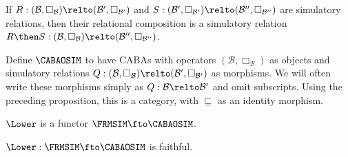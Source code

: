 \documentclass[a4paper,UKenglish,cleveref, autoref]{lipics-v2021}
\begin{document}
\begin{proposition}
  \label{proposition:simulatory-compose}
  If
  \(R : (\mathcal{B}, \Box_\mathcal{B}) \relto (\mathcal{B}',
  \Box_{\mathcal{B}'})\) and
  \(S : (\mathcal{B}', \Box_{\mathcal{B}'}) \relto (\mathcal{B}'',
  \Box_{\mathcal{B}''})\) are simulatory relations, then their relational
  composition is a simulatory relation
  \(R \then S : (\mathcal{B}, \Box_\mathcal{B}) \relto (\mathcal{B}'',
  \Box_{\mathcal{B}''})\).
\end{proposition}

Define \(\CABAOSIM\) to have CABAs with operators \((\mathcal{B},
\Box_\mathcal{B})\) as objects and simulatory relations
\(Q : (\mathcal{B}, \Box_\mathcal{B}) \relto (\mathcal{B}',
\Box_{\mathcal{B}'})\) as morphisms. We will often write these
morphisms simply as \(Q : \mathcal{B} \relto \mathcal{B}'\) and omit
subscripts. Using the preceding proposition, this is a category, with
\(\sqsubseteq\) as an identity morphism.

\begin{lemma}
  \label{lemma:lower-frmsim-functor}
  \(\Lower\) is a functor \(\FRMSIM \fto \CABAOSIM\).
\end{lemma}

\begin{lemma}
  \label{lemma:lower-frmsim-faithful}
  \(\Lower : \FRMSIM \fto \CABAOSIM\) is faithful.
\end{lemma}
\end{document}
